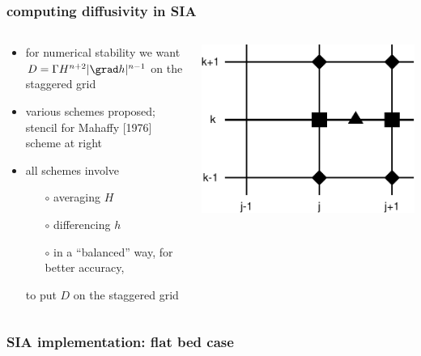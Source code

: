 \begin{frame}
  \frametitle{computing diffusivity in SIA}

\begin{columns}
\begin{column}{0.6\textwidth}
\begin{itemize}
\item for numerical stability we want $D = \Gamma H^{n+2} |\grad h|^{n-1}$ on the staggered grid
\item various schemes proposed; stencil for Mahaffy [1976] scheme at right
\item all schemes involve
  \begin{itemize}
  \item[$\circ$] averaging $H$
  \item[$\circ$] differencing $h$
  \item[$\circ$] in a ``balanced'' way, for better accuracy,
  \end{itemize}
to put $D$ on the staggered grid
\end{itemize}
\end{column}

\begin{column}{0.4\textwidth}
  \includegraphics[width=1.0\textwidth]{photos/mahaffystencil}
\end{column}
\end{columns}
\end{frame}


\begin{frame}
  \frametitle{SIA implementation: flat bed case}

\end{frame}


